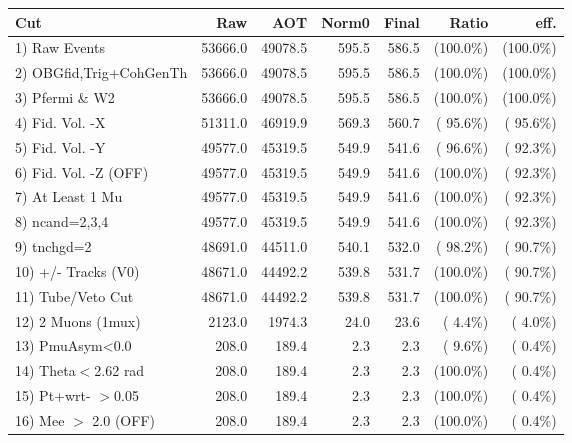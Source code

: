  \begin{table}[h!]\centering
 \begin{tabular}{||l||r|r|r|r|r|r||}
 \hline
 \hline
 Cut & Raw & AOT & Norm0 & Final & Ratio & eff.       \\
 \hline
  1) Raw Events           &      53666.0 &      49078.5 &        595.5 &        586.5 & (100.0\%) & (100.0\%) \\
  2) OBGfid,Trig+CohGenTh &      53666.0 &      49078.5 &        595.5 &        586.5 & (100.0\%) & (100.0\%) \\
  3) Pfermi \& W2         &      53666.0 &      49078.5 &        595.5 &        586.5 & (100.0\%) & (100.0\%) \\
  4) Fid. Vol. -X         &      51311.0 &      46919.9 &        569.3 &        560.7 & ( 95.6\%) & ( 95.6\%) \\
  5) Fid. Vol. -Y         &      49577.0 &      45319.5 &        549.9 &        541.6 & ( 96.6\%) & ( 92.3\%) \\
  6) Fid. Vol. -Z (OFF)   &      49577.0 &      45319.5 &        549.9 &        541.6 & (100.0\%) & ( 92.3\%) \\
  7) At Least 1 Mu        &      49577.0 &      45319.5 &        549.9 &        541.6 & (100.0\%) & ( 92.3\%) \\
  8) ncand=2,3,4          &      49577.0 &      45319.5 &        549.9 &        541.6 & (100.0\%) & ( 92.3\%) \\
  9) tnchgd=2             &      48691.0 &      44511.0 &        540.1 &        532.0 & ( 98.2\%) & ( 90.7\%) \\
 10) +/- Tracks (V0)      &      48671.0 &      44492.2 &        539.8 &        531.7 & (100.0\%) & ( 90.7\%) \\
 11) Tube/Veto Cut        &      48671.0 &      44492.2 &        539.8 &        531.7 & (100.0\%) & ( 90.7\%) \\
 12) 2 Muons (1mux)       &       2123.0 &       1974.3 &         24.0 &         23.6 & (  4.4\%) & (  4.0\%) \\
 13) PmuAsym<0.0          &        208.0 &        189.4 &          2.3 &          2.3 & (  9.6\%) & (  0.4\%) \\
 14) Theta$<$2.62 rad     &        208.0 &        189.4 &          2.3 &          2.3 & (100.0\%) & (  0.4\%) \\
 15) Pt+wrt- $>$0.05      &        208.0 &        189.4 &          2.3 &          2.3 & (100.0\%) & (  0.4\%) \\
 16) Mee $>$ 2.0  (OFF)   &        208.0 &        189.4 &          2.3 &          2.3 & (100.0\%) & (  0.4\%) \\

\end{tabular}
\end{table}
